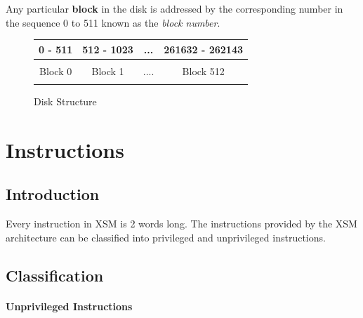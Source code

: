 \documentclass[11pt]{report}
\begin{document}
Any particular \textbf{block} in the disk is addressed by the corresponding number in the sequence 0 to 511 known as the \textit{block number}.

\begin{figure}[htp!] \small
	\centering
	\begin{tabular}{|c|c|c|c|} 
	\hline
       0 - 511 & 512 - 1023 & ... &   261632 - 262143     \\
       \hline      
      & & & \\ 
      Block 0 & Block 1  & .... & Block 512 \\ 
      & & & \\       
       \hline
       
	\end{tabular}
	\caption{Disk Structure}
	\label{fig:mem_struct}
\end{figure}




 \chapter{Instructions}
\label{sec:inst}
\section{Introduction}

Every instruction in XSM is 2 words long. The instructions provided by the XSM architecture can be classified into privileged and unprivileged instructions.

\section{Classification}

\subsubsection{Unprivileged Instructions}
\end{document}
